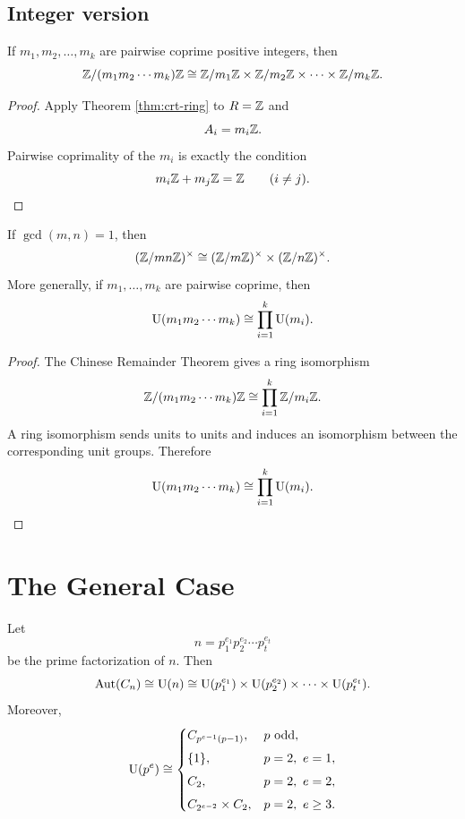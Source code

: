\subsection{Integer version}

\begin{corollary}\label{cor:crt-int}
If $m_1,m_2,\ldots,m_k$ are pairwise coprime positive integers, then
\[
    \mathbb{Z}/(m_1m_2\cdots m_k)\mathbb{Z}
    \cong
    \mathbb{Z}/m_1\mathbb{Z}\times\mathbb{Z}/m_2\mathbb{Z}\times\cdots\times\mathbb{Z}/m_k\mathbb{Z}.
\]
\end{corollary}

\begin{proof}
Apply Theorem \ref{thm:crt-ring} to $R=\mathbb{Z}$ and
\[
    A_i=m_i\mathbb{Z}.
\]
Pairwise coprimality of the $m_i$ is exactly the condition
\[
    m_i\mathbb{Z}+m_j\mathbb{Z}=\mathbb{Z}
    \qquad(i\neq j).
\]
\end{proof}

\begin{corollary}\label{cor:crt-units}
If $\gcd(m,n)=1$, then
\[
    (\mathbb{Z}/mn\mathbb{Z})^\times
    \cong
    (\mathbb{Z}/m\mathbb{Z})^\times\times(\mathbb{Z}/n\mathbb{Z})^\times.
\]
More generally, if $m_1,\ldots,m_k$ are pairwise coprime, then
\[
    \mathrm{U}(m_1m_2\cdots m_k)
    \cong
    \prod_{i=1}^k \mathrm{U}(m_i).
\]
\end{corollary}

\begin{proof}
The Chinese Remainder Theorem gives a ring isomorphism
\[
    \mathbb{Z}/(m_1m_2\cdots m_k)\mathbb{Z}
    \cong
    \prod_{i=1}^k \mathbb{Z}/m_i\mathbb{Z}.
\]
A ring isomorphism sends units to units and induces an isomorphism between the corresponding unit groups. Therefore
\[
    \mathrm{U}(m_1m_2\cdots m_k)
    \cong
    \prod_{i=1}^k \mathrm{U}(m_i).
\]
\end{proof}

\section{The General Case}

\begin{theorem}\label{thm:general-aut-cn}
Let
\[
    n=p_1^{e_1}p_2^{e_2}\cdots p_t^{e_t}
\]
be the prime factorization of $n$. Then
\[
    \operatorname{Aut}(C_n)
    \cong
    \mathrm{U}(n)
    \cong
    \mathrm{U}(p_1^{e_1})\times\mathrm{U}(p_2^{e_2})\times\cdots\times\mathrm{U}(p_t^{e_t}).
\]
Moreover,
\[
    \mathrm{U}(p^e)\cong
    \begin{cases}
        C_{p^{e-1}(p-1)}, & p\text{ odd},\\[4pt]
        \{1\}, & p=2,\ e=1,\\[4pt]
        C_2, & p=2,\ e=2,\\[4pt]
        C_{2^{e-2}}\times C_2, & p=2,\ e\geq3.
    \end{cases}
\]
\end{theorem}

